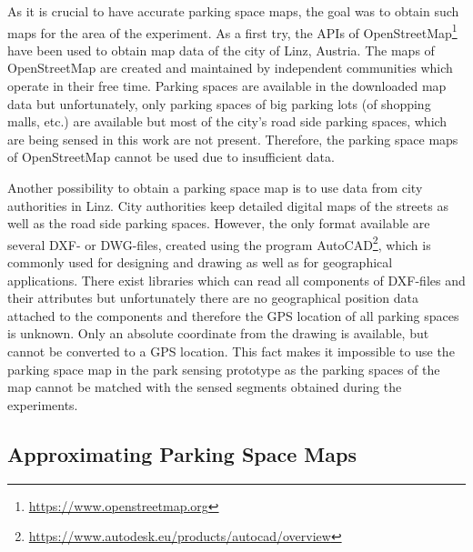 As it is crucial to have accurate parking space maps, the goal was to obtain such maps for the area of the experiment. As a first try, the APIs of OpenStreetMap\footnote{\url{https://www.openstreetmap.org}} have been used to obtain map data of the city of Linz, Austria. The maps of OpenStreetMap are created and maintained by independent communities which operate in their free time. Parking spaces are available in the downloaded map data but unfortunately, only parking spaces of big parking lots (of shopping malls, etc.) are available but most of the city's road side parking spaces, which are being sensed in this work are not present. Therefore, the parking space maps of OpenStreetMap cannot be used due to insufficient data.

Another possibility to obtain a parking space map is to use data from city authorities in Linz. City authorities keep detailed digital maps of the streets as well as the road side parking spaces. However, the only format available are several DXF- or DWG-files, created using the program AutoCAD\footnote{\url{https://www.autodesk.eu/products/autocad/overview}}, which is commonly used for designing and drawing as well as for geographical applications. There exist libraries which can read all components of DXF-files and their attributes but unfortunately there are no geographical position data attached to the components and therefore the GPS location of all parking spaces is unknown. Only an absolute coordinate from the drawing is available, but cannot be converted to a GPS location. This fact makes it impossible to use the parking space map in the park sensing prototype as the parking spaces of the map cannot be matched with the sensed segments obtained during the experiments.



\subsection{Approximating Parking Space Maps}

%
%

